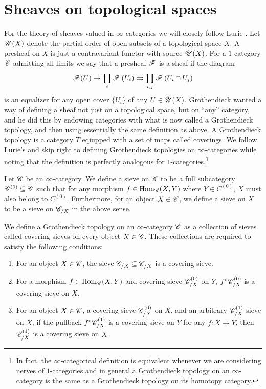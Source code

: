 \documentclass[../../thesis.tex]{subfiles}
\begin{document}
\section{Sheaves on topological spaces}
For the theory of sheaves valued in $\infty$-categories we will closely follow Lurie \cite{HTT}.
Let $\mathscr{U}(X)$ denote the partial order of open subsets of a topological space $X$.
A presheaf on $X$ is just a contravariant functor with source $\mathscr{U}(X)$.
For a $1$-category $\mathscr{C}$ admitting all limits we say that a presheaf $\mathscr{F}$ is a sheaf if the diagram
\[
    \mathscr{F}(U) \rightarrow \prod_{i} \mathscr{F}\left(U_{i}\right) \rightrightarrows \prod_{i, j} \mathscr{F}\left(U_{i} \cap U_{j}\right)
\]
is an equalizer for any open cover $\{U_i\}$ of any $U \in \mathscr{U}(X)$.
Grothendieck wanted a way of defining a sheaf not just on a topological space, but on ``any'' category, and he did this by endowing categories with what is now called a Grothendieck topology, and then using essentially the same definition as above.
A Grothendieck topology is a category $T$ eqiupped with a set of maps called coverings.
We follow Lurie's \cite{HTT} and skip right to defining Grothendieck topologies on $\infty$-categories while noting that the definition is perfectly analogous for $1$-categories.\footnote{In fact, the $\infty$-categorical definition is equivalent whenever we are considering nerves of $1$-categories and in general a Grothendieck topology on an $\infty$-category is the same as a Grothendieck topology on its homotopy category.}
\begin{definition}
    Let $\mathscr{C}$ be an $\infty$-category.
    We define a sieve on $\mathscr{C}$ to be a full subcategory $\mathscr{C}^{(0)} \subseteq \mathscr{C}$ such that for any morphism $f \in \mathrm{Hom}_{\mathscr{C}}(X,Y)$ where $Y\in C^{(0)}$, $X$ must also belong to $C^{(0)}$.
    Furthermore, for an object $X \in \mathscr{C}$, we define a sieve on $X$ to be a sieve on $\mathscr{C}_{/X}$ in the above sense.
\end{definition}
\begin{definition}
    We define a Grothendieck topology on an $\infty$-category $\mathscr{C}$ as a collection of sieves called covering sieves on every object $X\in \mathscr{C}$.
    These collections are required to satisfy the following conditions:
    \begin{enumerate}
        \item For an object $X\in \mathscr{C}$, the sieve $\mathscr{C}_{/X} \subseteq \mathscr{C}_{/X}$ is a covering sieve.
        \item For a morphism $f \in \mathrm{Hom}_{\mathscr{C}}(X,Y)$ and covering sieve $\mathscr{C}^{(0)}_{/X}$ on $Y$, $f^*\mathscr{C}^{(0)}_{/X}$ is a covering sieve on $X$.
        \item For an object $X \in \mathscr{C}$, a covering sieve $\mathscr{C}^{(0)}_{/X}$ on $X$, and an arbitrary  $\mathscr{C}^{(1)}_{/X}$ sieve on $X$, if the pullback $f^*\mathscr{C}^{(1)}_{/X}$ is a covering sieve on $Y$ for any $f: X \to Y$, then $\mathscr{C}^{(1)}_{/X}$ is a covering sieve on $X$.
    \end{enumerate}
\end{definition}
\end{document}
